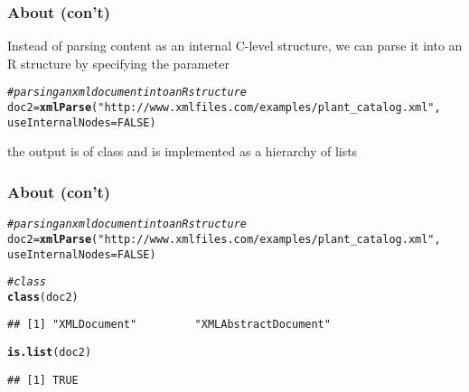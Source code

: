 \documentclass[12pt]{beamer}\usepackage[]{graphicx}\usepackage[]{color}
\makeatletter
\newcommand{\hlnum}[1]{\textcolor[rgb]{0.686,0.059,0.569}{#1}}%
\newcommand{\hlstr}[1]{\textcolor[rgb]{0.192,0.494,0.8}{#1}}%
\newcommand{\hlcom}[1]{\textcolor[rgb]{0.678,0.584,0.686}{\textit{#1}}}%
\newcommand{\hlstd}[1]{\textcolor[rgb]{0.345,0.345,0.345}{#1}}%
\newcommand{\hlkwb}[1]{\textcolor[rgb]{0.69,0.353,0.396}{#1}}%
\newcommand{\hlkwc}[1]{\textcolor[rgb]{0.333,0.667,0.333}{#1}}%
\newcommand{\hlkwd}[1]{\textcolor[rgb]{0.737,0.353,0.396}{\textbf{#1}}}%
\newenvironment{kframe}{%
 \def\at@end@of@kframe{}%
 \ifinner\ifhmode%
  \def\at@end@of@kframe{\end{minipage}}%
  \begin{minipage}{\columnwidth}%
 \fi\fi%
 \def\FrameCommand##1{\hskip\@totalleftmargin \hskip-\fboxsep
 \colorbox{shadecolor}{##1}\hskip-\fboxsep
     \hskip-\linewidth \hskip-\@totalleftmargin \hskip\columnwidth}%
 \MakeFramed {\advance\hsize-\width
   \@totalleftmargin\z@ \linewidth\hsize
   \@setminipage}}%
 {\par\unskip\endMakeFramed%
 \at@end@of@kframe}
\newenvironment{knitrout}{}{} %
\makeatother
\begin{document}

\begin{frame}[fragile]
\frametitle{About  (con't)}

Instead of parsing content as an internal C-level structure, we can parse it into an R structure by specifying the parameter {\hilit {}}
\eb
\begin{knitrout}\scriptsize
{}\color{fgcolor}\begin{kframe}
\begin{alltt}
\hlcom{# parsing an xml document into an R structure}
\hlstd{doc2} \hlkwb{=} \hlkwd{xmlParse}\hlstd{(}\hlstr{"http://www.xmlfiles.com/examples/plant_catalog.xml"}\hlstd{,}
                \hlkwc{useInternalNodes} \hlstd{=} \hlnum{FALSE}\hlstd{)}
\end{alltt}
\end{kframe}
\end{knitrout}

the output is of class {\hilit {}} and is implemented as a hierarchy of lists

\end{frame}


\begin{frame}[fragile]
\frametitle{About  (con't)}
\begin{knitrout}\scriptsize
{}\color{fgcolor}\begin{kframe}
\begin{alltt}
\hlcom{# parsing an xml document into an R structure}
\hlstd{doc2} \hlkwb{=} \hlkwd{xmlParse}\hlstd{(}\hlstr{"http://www.xmlfiles.com/examples/plant_catalog.xml"}\hlstd{,}
                \hlkwc{useInternalNodes} \hlstd{=} \hlnum{FALSE}\hlstd{)}
\end{alltt}
\end{kframe}
\end{knitrout}

\begin{knitrout}\footnotesize
{}\color{fgcolor}\begin{kframe}
\begin{alltt}
\hlcom{# class }
\hlkwd{class}\hlstd{(doc2)}
\end{alltt}
\begin{verbatim}
## [1] "XMLDocument"         "XMLAbstractDocument"
\end{verbatim}
\begin{alltt}
\hlkwd{is.list}\hlstd{(doc2)}
\end{alltt}
\begin{verbatim}
## [1] TRUE
\end{verbatim}
\end{kframe}
\end{knitrout}

\end{frame}
\end{document}
